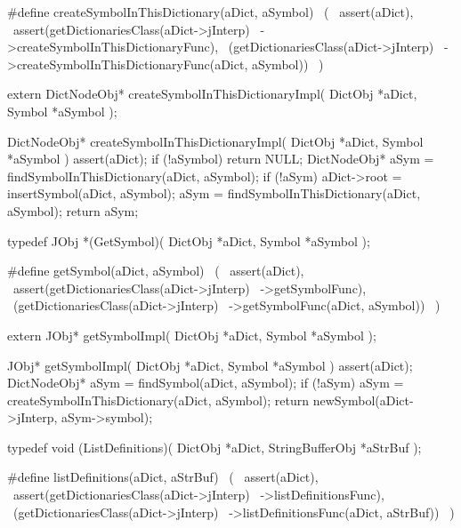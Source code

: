 #define createSymbolInThisDictionary(aDict, aSymbol)      \
        (                                                 \
    assert(aDict),                                        \
    assert(getDictionariesClass(aDict->jInterp)           \
      ->createSymbolInThisDictionaryFunc),                \
    (getDictionariesClass(aDict->jInterp)                 \
      ->createSymbolInThisDictionaryFunc(aDict, aSymbol)) \
  )
\stopCHeader

\setCHeaderStream{private}
\startCHeader
extern DictNodeObj* createSymbolInThisDictionaryImpl(
  DictObj *aDict,
  Symbol  *aSymbol
);
\stopCHeader
\setCHeaderStream{public}

\startCCode
DictNodeObj* createSymbolInThisDictionaryImpl(
  DictObj *aDict,
  Symbol  *aSymbol
) {
  assert(aDict);
  if (!aSymbol) return NULL;
  DictNodeObj* aSym =
    findSymbolInThisDictionary(aDict, aSymbol);
  if (!aSym) {
    aDict->root = insertSymbol(aDict, aSymbol);
    aSym = findSymbolInThisDictionary(aDict, aSymbol);
  }
  return aSym;
}
\stopCCode
\stopTestSuite

\startTestSuite[getSymbol]

\startCHeader
typedef JObj *(GetSymbol)(
  DictObj *aDict,
  Symbol  *aSymbol
);

#define getSymbol(aDict, aSymbol)               \
  (                                             \
    assert(aDict),                              \
    assert(getDictionariesClass(aDict->jInterp) \
      ->getSymbolFunc),                         \
    (getDictionariesClass(aDict->jInterp)       \
      ->getSymbolFunc(aDict, aSymbol))          \
  )
\stopCHeader

\startCHeader
extern JObj* getSymbolImpl(
  DictObj *aDict,
  Symbol  *aSymbol
);
\stopCHeader
\setCHeaderStream{public}

\startCCode
JObj* getSymbolImpl(
  DictObj *aDict,
  Symbol  *aSymbol
) {
  assert(aDict);
  DictNodeObj* aSym = findSymbol(aDict, aSymbol);
  if (!aSym) {
    aSym = createSymbolInThisDictionary(aDict, aSymbol);
  }
  return newSymbol(aDict->jInterp, aSym->symbol);
}
\stopCCode
\stopTestSuite

\startTestSuite[listDefinitions]

\startCHeader
typedef void (ListDefinitions)(
  DictObj         *aDict,
  StringBufferObj *aStrBuf
);

#define listDefinitions(aDict, aStrBuf)         \
  (                                             \
    assert(aDict),                              \
    assert(getDictionariesClass(aDict->jInterp) \
      ->listDefinitionsFunc),                   \
    (getDictionariesClass(aDict->jInterp)       \
      ->listDefinitionsFunc(aDict, aStrBuf))    \
  )
\stopCHeader

